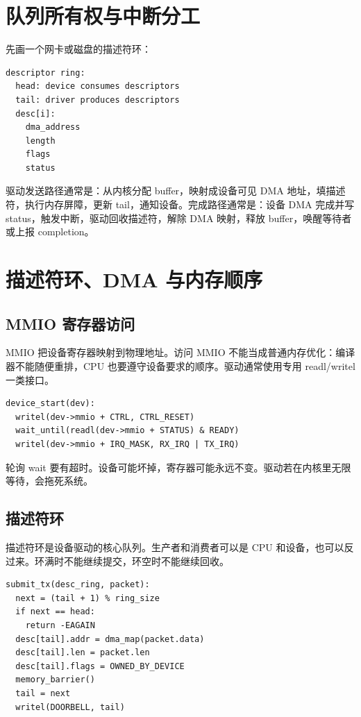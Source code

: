 \section{队列所有权与中断分工}

先画一个网卡或磁盘的描述符环：

\begin{lstlisting}
descriptor ring:
  head: device consumes descriptors
  tail: driver produces descriptors
  desc[i]:
    dma_address
    length
    flags
    status
\end{lstlisting}

驱动发送路径通常是：从内核分配 buffer，映射成设备可见 DMA 地址，填描述符，执行内存屏障，更新 tail，通知设备。完成路径通常是：设备 DMA 完成并写 status，触发中断，驱动回收描述符，解除 DMA 映射，释放 buffer，唤醒等待者或上报 completion。

\section{描述符环、DMA 与内存顺序}

\subsection{MMIO 寄存器访问}

MMIO 把设备寄存器映射到物理地址。访问 MMIO 不能当成普通内存优化：编译器不能随便重排，CPU 也要遵守设备要求的顺序。驱动通常使用专用 readl/writel 一类接口。

\begin{lstlisting}
device_start(dev):
  writel(dev->mmio + CTRL, CTRL_RESET)
  wait_until(readl(dev->mmio + STATUS) & READY)
  writel(dev->mmio + IRQ_MASK, RX_IRQ | TX_IRQ)
\end{lstlisting}

轮询 wait 要有超时。设备可能坏掉，寄存器可能永远不变。驱动若在内核里无限等待，会拖死系统。

\subsection{描述符环}

描述符环是设备驱动的核心队列。生产者和消费者可以是 CPU 和设备，也可以反过来。环满时不能继续提交，环空时不能继续回收。

\begin{lstlisting}
submit_tx(desc_ring, packet):
  next = (tail + 1) % ring_size
  if next == head:
    return -EAGAIN
  desc[tail].addr = dma_map(packet.data)
  desc[tail].len = packet.len
  desc[tail].flags = OWNED_BY_DEVICE
  memory_barrier()
  tail = next
  writel(DOORBELL, tail)
\end{lstlisting}

